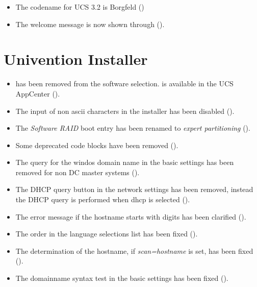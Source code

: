 \newcommand{\ucsUCRV}[1]{Univention Configuration Registry variable \ucsCommand{\ucsBCindex{#1}}}
\newcommand{\ucsCVE}[1]{\href{http://security-tracker.debian.org/tracker/CVE-#1}{CVE-#1}}

\begin{itemize}
\item The codename for UCS 3.2 is Borgfeld ()

\item The welcome message is now shown through  ().

\end{itemize}


\section{Univention Installer}
\begin{itemize}

\item {} has been removed from the software
selection.  is available in the UCS AppCenter
(). 

\item The input of non ascii characters in the installer has been disabled
().

\item The \emph{Software RAID} boot entry has been renamed to \emph{expert
partitioning} ().

\item Some deprecated code blocks have been removed ().

\item The query for the windos domain name in the basic settings has been
removed for non DC master systems ().

\item The DHCP query button in the network settings has been removed, instead
the DHCP query is performed when dhcp is selected ().

\item The error message if the hostname starts with digits has been clarified
().

\item The order in the language selections list has been fixed
().

\item The determination of the hostname, if
\emph{scan=hostname} is set, has been fixed
().

\item The domainname syntax test in the basic settings has been fixed
().

\end{itemize}

